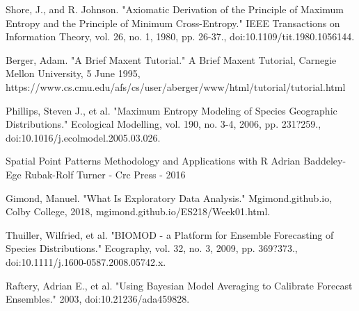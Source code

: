 \noindent [10]  Shore, J., and R. Johnson. 
"Axiomatic Derivation of the Principle of Maximum Entropy and the Principle of Minimum Cross-Entropy." 
IEEE Transactions on Information Theory, vol. 26, no. 1, 1980, pp. 26-37.,
doi:10.1109/tit.1980.1056144. \newline

\noindent [11] Berger, Adam. "A Brief Maxent Tutorial." A Brief Maxent Tutorial, \newline Carnegie Mellon University, 5 June 1995, \newline 
https://www.cs.cmu.edu/afs/cs/user/aberger/www/html/tutorial/tutorial.html\newline

\noindent [12] Phillips, Steven J., et al. 
"Maximum Entropy Modeling of Species Geographic Distributions."
Ecological Modelling, vol. 190, no. 3-4, 2006, pp. 231?259.,\newline
doi:10.1016/j.ecolmodel.2005.03.026. \newline

\noindent[13] Spatial Point Patterns Methodology and Applications with R
Adrian Baddeley-Ege Rubak-Rolf Turner - Crc Press - 2016 \newline

\noindent [14] Gimond, Manuel. "What Is Exploratory Data Analysis." Mgimond.github.io, \newline Colby College, 2018, mgimond.github.io/ES218/Week01.html. \newline

\noindent [15] Thuiller, Wilfried, et al. "BIOMOD - a Platform for Ensemble Forecasting 
of Species Distributions." Ecography, vol. 32, no. 3, 2009, pp. 369?373.,
doi:10.1111/j.1600-0587.2008.05742.x. \newline
 
 \noindent [16] Raftery, Adrian E., et al. 
"Using Bayesian Model Averaging to Calibrate Forecast Ensembles." 2003,
 doi:10.21236/ada459828.
 
 
 
 